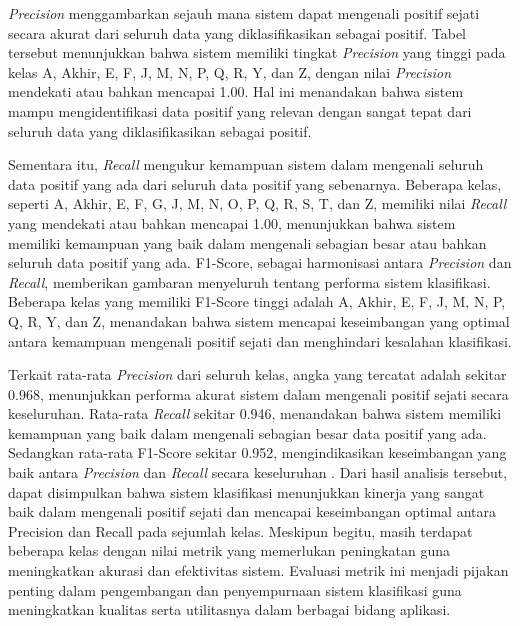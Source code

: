 \textit{Precision} menggambarkan sejauh mana sistem dapat mengenali positif sejati secara akurat dari seluruh data yang diklasifikasikan sebagai positif. Tabel tersebut menunjukkan bahwa sistem memiliki tingkat \textit{Precision} yang tinggi pada kelas A, Akhir, E, F, J, M, N, P, Q, R, Y, dan Z, dengan nilai \textit{Precision} mendekati atau bahkan mencapai 1.00. Hal ini menandakan bahwa sistem mampu mengidentifikasi data positif yang relevan dengan sangat tepat dari seluruh data yang diklasifikasikan sebagai positif.

Sementara itu, \textit{Recall} mengukur kemampuan sistem dalam mengenali seluruh data positif yang ada dari seluruh data positif yang sebenarnya. Beberapa kelas, seperti A, Akhir, E, F, G, J, M, N, O, P, Q, R, S, T, dan Z, memiliki nilai \textit{Recall} yang mendekati atau bahkan mencapai 1.00, menunjukkan bahwa sistem memiliki kemampuan yang baik dalam mengenali sebagian besar atau bahkan seluruh data positif yang ada. F1-Score, sebagai harmonisasi antara \textit{Precision} dan \textit{Recall}, memberikan gambaran menyeluruh tentang performa sistem klasifikasi. Beberapa kelas yang memiliki F1-Score tinggi adalah A, Akhir, E, F, J, M, N, P, Q, R, Y, dan Z, menandakan bahwa sistem mencapai keseimbangan yang optimal antara kemampuan mengenali positif sejati dan menghindari kesalahan klasifikasi.

Terkait rata-rata \textit{Precision} dari seluruh kelas, angka yang tercatat adalah sekitar 0.968, menunjukkan performa akurat sistem dalam mengenali positif sejati secara keseluruhan. Rata-rata \textit{Recall} sekitar 0.946, menandakan bahwa sistem memiliki kemampuan yang baik dalam mengenali sebagian besar data positif yang ada. Sedangkan rata-rata F1-Score sekitar 0.952, mengindikasikan keseimbangan yang baik antara \textit{Precision} dan \textit{Recall} secara keseluruhan . Dari hasil analisis tersebut, dapat disimpulkan bahwa sistem klasifikasi menunjukkan kinerja yang sangat baik dalam mengenali positif sejati dan mencapai keseimbangan optimal antara Precision dan Recall pada sejumlah kelas. Meskipun begitu, masih terdapat beberapa kelas dengan nilai metrik yang memerlukan peningkatan guna meningkatkan akurasi dan efektivitas sistem. Evaluasi metrik ini menjadi pijakan penting dalam pengembangan dan penyempurnaan sistem klasifikasi guna meningkatkan kualitas serta utilitasnya dalam berbagai bidang aplikasi.

